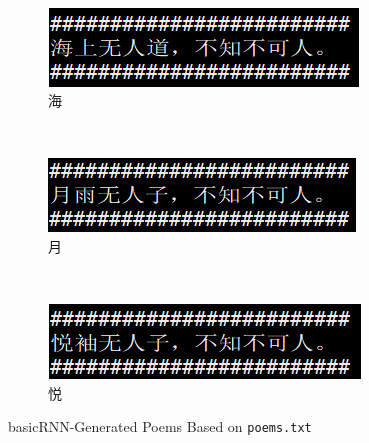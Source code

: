 \documentclass[10pt]{article}
\begin{document}
\begin{figure}[H]
~
\begin{subfigure}[t]{0.23\textwidth}
\centering
\includegraphics[scale=.6]{rnn_6.png}
\caption{海}
\label{rnn_6}
\end{subfigure}
~
\begin{subfigure}[t]{0.23\textwidth}
\centering
\includegraphics[scale=.6]{rnn_7.png}
\caption{月}
\label{rnn_7}
\end{subfigure}
~
\begin{subfigure}[t]{0.23\textwidth}
\centering
\includegraphics[scale=.6]{rnn_8.png}
\caption{悦}
\label{rnn_8}
\end{subfigure}
\caption{basicRNN-Generated Poems Based on \texttt{poems.txt}}
\end{figure}
\end{document}
